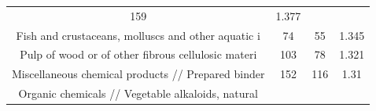 \documentclass[10pt,]{article}
\begin{document}
\begin{longtable}[]{@{}cccc@{}}
\begin{minipage}[t]{0.20\columnwidth}
159\strut
\end{minipage} & \begin{minipage}[t]{0.09\columnwidth}\centering\strut
1.377\strut
\end{minipage}\tabularnewline
\begin{minipage}[t]{0.38\columnwidth}\centering\strut
Fish and crustaceans, molluscs and other aquatic i\strut
\end{minipage} & \begin{minipage}[t]{0.21\columnwidth}\centering\strut
74\strut
\end{minipage} & \begin{minipage}[t]{0.20\columnwidth}\centering\strut
55\strut
\end{minipage} & \begin{minipage}[t]{0.09\columnwidth}\centering\strut
1.345\strut
\end{minipage}\tabularnewline
\begin{minipage}[t]{0.38\columnwidth}\centering\strut
Pulp of wood or of other fibrous cellulosic materi\strut
\end{minipage} & \begin{minipage}[t]{0.21\columnwidth}\centering\strut
103\strut
\end{minipage} & \begin{minipage}[t]{0.20\columnwidth}\centering\strut
78\strut
\end{minipage} & \begin{minipage}[t]{0.09\columnwidth}\centering\strut
1.321\strut
\end{minipage}\tabularnewline
\begin{minipage}[t]{0.38\columnwidth}\centering\strut
Miscellaneous chemical products // Prepared binder\strut
\end{minipage} & \begin{minipage}[t]{0.21\columnwidth}\centering\strut
152\strut
\end{minipage} & \begin{minipage}[t]{0.20\columnwidth}\centering\strut
116\strut
\end{minipage} & \begin{minipage}[t]{0.09\columnwidth}\centering\strut
1.31\strut
\end{minipage}\tabularnewline
\begin{minipage}[t]{0.38\columnwidth}\centering\strut
Organic chemicals // Vegetable alkaloids, natural\strut
\end{minipage} & \begin{minipage}[t]{0.21\columnwidth}\centering\strut

\end{minipage}
\end{longtable}
\end{document}

